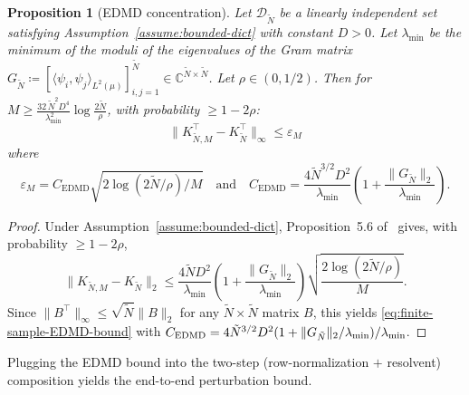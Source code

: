 \documentclass{article}
\theoremstyle{plain}
\newtheorem{proposition}[theorem]{Proposition}
\theoremstyle{definition}
\def\C{\mathbb{C}}
\def\tp{\intercal}
\def\by{\times}
\def\Dc{\mathcal{D}}
\begin{document}
\begin{proposition}[EDMD concentration]\label{prop:finite-sample-edmd}
	Let $\Dc_{\tilde{N}}$ be a linearly independent set satisfying Assumption~\ref{assume:bounded-dict} with constant $D > 0$.
	Let $\lambda_{\min}$ be the minimum of the moduli of the eigenvalues of the Gram matrix $G_{\tilde{N}} \coloneqq [\langle \psi_i,  \psi_j\rangle_{L^2(\mu)}]_{i,j=1}^{\tilde{N}} \in \C^{\tilde N \by \tilde N}$.  Let $\rho \in (0, 1/2)$.
	Then for $M \geq \frac{32\,\tilde{N}^2 D^4}{\lambda_{\min}^2}\log\frac{2\tilde{N}}{\rho}$, with probability $\geq 1 - 2\rho$:
	\begin{equation}\label{eq:finite-sample-EDMD-bound}
		\|K_{\tilde{N},M}^\tp - K_{\tilde{N}}^\tp\|_\infty \leq \varepsilon_M
	\end{equation}
	where
	\begin{equation}\label{eq:epsM-def}
		\varepsilon_M = C_{\text{EDMD}}\sqrt{2\log(2\tilde{N}/\rho)/M} \quad \text{and} \quad C_{\text{EDMD}} = \frac{4\tilde{N}^{3/2}D^2}{\lambda_{\min}}\!\left(1 + \frac{\|G_{\tilde{N}}\|_2}{\lambda_{\min}}\right).
	\end{equation}
\end{proposition}

\begin{proof}%
	Under Assumption~\ref{assume:bounded-dict},
	Proposition~5.6 of~\cite{elias2024datadriven} gives, with probability $\geq 1-2\rho$,
	\[
	\|K_{\tilde{N},M} - K_{\tilde{N}}\|_2 \leq \frac{4\tilde{N}D^2}{\lambda_{\min}}\!\left(1+\frac{\|G_{\tilde{N}}\|_2}{\lambda_{\min}}\right)\sqrt{\frac{2\log(2\tilde{N}/\rho)}{M}}.
	\]
	Since $\|B^\tp\|_\infty \leq \sqrt{\tilde{N}}\|B\|_2$ for any $\tilde{N}\times\tilde{N}$ matrix $B$, this yields \eqref{eq:finite-sample-EDMD-bound} with $C_{\textnormal{EDMD}} = 4\tilde{N}^{3/2}D^2(1+\|G_{\tilde{N}}\|_2/\lambda_{\min})/\lambda_{\min}$.
\end{proof}


Plugging the EDMD bound into the two-step (row-normalization $+$ resolvent) composition yields the end-to-end perturbation bound.
\end{document}
